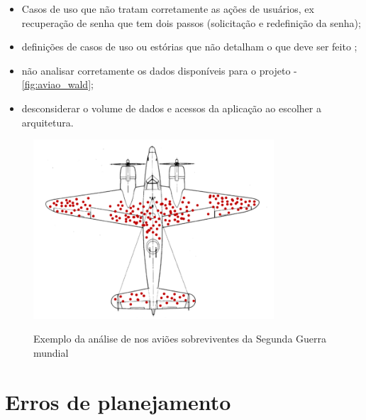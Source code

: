 \begin{itemize}
    \item Casos de uso que não tratam corretamente as ações de usuários, ex recuperação de senha que tem dois passos (solicitação e redefinição da senha);
    
    \item definições de casos de uso ou estórias que não detalham o que deve ser feito 
    \newline
    ;
    
    \item não analisar corretamente os dados disponíveis para o projeto \cite{boas_perguntas_dados} \cite{guerra-matematica} \cite{ellenberg2015poder} -  \autoref{fig:aviao_wald};

    
    \item desconsiderar o volume de dados e acessos da aplicação ao escolher a arquitetura.
\end{itemize}

\begin{figure}
    \centering
    \caption{Exemplo da análise de  nos aviões sobreviventes da Segunda Guerra mundial}
	\includegraphics[width=0.8\textwidth]{erros/aviao_wald.png}
    \label{fig:aviao_wald}
\end{figure}


\section{Erros de planejamento}


